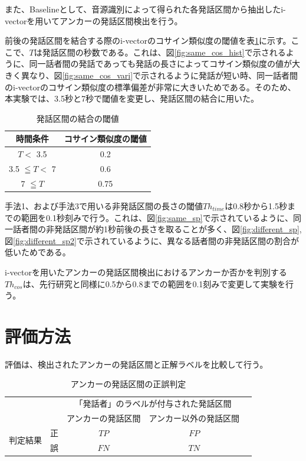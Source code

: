{また、Baselineとして、音源識別によって得られた各発話区間から抽出したi-vectorを用いてアンカーの発話区間検出を行う。


前後の発話区間を結合する際のi-vectorのコサイン類似度の閾値を表\ref{table:decide_thcos}に示す。ここで、$T$は発話区間の秒数である。これは、図\ref{fig:same_cos_hist}で示されるように、同一話者間の発話であっても発話の長さによってコサイン類似度の値が大きく異なり、図\ref{fig:same_cos_vari}で示されるように発話が短い時、同一話者間のi-vectorのコサイン類似度の標準偏差が非常に大きいためである。そのため、本実験では、3.5秒と7秒で閾値を変更し、発話区間の結合に用いた。

\begin{table}[H]
  \begin{center}
    \caption{発話区間の結合の閾値 \label{table:decide_thcos}}
    \begin{tabular}{|c||c|} \hline
時間条件 & コサイン類似度の閾値  \\ \hline
$T <$ 3.5 &  0.2 \\ \hline
3.5 $\leqq T <$ 7 &  0.6  \\ \hline
7 $\leqq T$ &  0.75 \\ \hline
    \end{tabular}
  \end{center}
\end{table}

手法1、および手法3で用いる非発話区間の長さの閾値$Th_{time}$は0.8秒から1.5秒までの範囲を0.1秒刻みで行う。これは、図\ref{fig:same_sp}で示されているように、同一話者間の非発話区間が約1秒前後の長さを取ることが多く、図\ref{fig:different_sp},図\ref{fig:different_sp2}で示されているように、異なる話者間の非発話区間の割合が低いためである。\par
i-vectorを用いたアンカーの発話区間検出におけるアンカーか否かを判別する$Th_{cos}$は、先行研究\cite{nozaki_gakuseikai}と同様に0.5から0.8までの範囲を0.1刻みで変更して実験を行う。\par


\section{評価方法}
評価は、検出されたアンカーの発話区間と正解ラベルを比較して行う。

\begin{table}[H]
\begin{center}
    \caption{アンカーの発話区間の正誤判定 \label{table:clustering}}
\begin{tabular}{|c|c|c|c|l}
\cline{1-4}
\multicolumn{2}{|c|}{\multirow{2}{*}{}} & \multicolumn{2}{c|}{「発話者」のラベルが付与された発話区間} &  \\ \cline{3-4}
\multicolumn{2}{|c|}{}                  & アンカーの発話区間        & アンカー以外の発話区間        &  \\ \cline{1-4}
\multirow{2}{*}{判定結果}        & 正        & $TP$                  & $FP$                   &  \\ \cline{2-4}
& 誤        & $FN$                  & $TN$                   &  \\ \cline{1-4}
\end{tabular}
\end{center}
\end{table}

}
